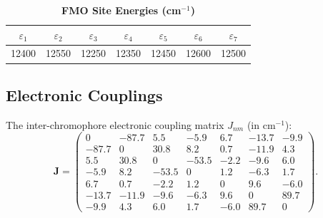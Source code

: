 \documentclass[aip,jcp,reprint]{revtex4-2}
\begin{document}
\begin{table}[h]
\centering
\caption{\textbf{FMO Site Energies (cm$^{-1}$)}}
\label{tab:SI_site_energies}
\begin{tabular}{ccccccc}
\toprule
$\varepsilon_1$ & $\varepsilon_2$ & $\varepsilon_3$ & $\varepsilon_4$ & $\varepsilon_5$ & $\varepsilon_6$ & $\varepsilon_7$ \\
\midrule
12400 & 12550 & 12250 & 12350 & 12450 & 12600 & 12500 \\
\bottomrule
\end{tabular}
\end{table}

\subsection{Electronic Couplings}
The inter-chromophore electronic coupling matrix $J_{nm}$ (in cm$^{-1}$):
\begin{equation}
\mathbf{J} = \begin{pmatrix}
0 & -87.7 & 5.5 & -5.9 & 6.7 & -13.7 & -9.9 \\
-87.7 & 0 & 30.8 & 8.2 & 0.7 & -11.9 & 4.3 \\
5.5 & 30.8 & 0 & -53.5 & -2.2 & -9.6 & 6.0 \\
-5.9 & 8.2 & -53.5 & 0 & 1.2 & -6.3 & 1.7 \\
6.7 & 0.7 & -2.2 & 1.2 & 0 & 9.6 & -6.0 \\
-13.7 & -11.9 & -9.6 & -6.3 & 9.6 & 0 & 89.7 \\
-9.9 & 4.3 & 6.0 & 1.7 & -6.0 & 89.7 & 0
\end{pmatrix}.
\label{eq:SI_coupling_matrix}
\end{equation}
\end{document}
